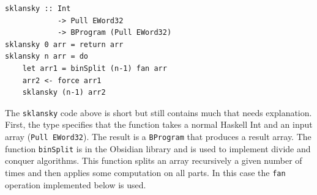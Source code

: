 \begin{small}
\begin{Verbatim}[samepage=true]
sklansky :: Int 
            -> Pull EWord32 
            -> BProgram (Pull EWord32)
sklansky 0 arr = return arr
sklansky n arr = do 
    let arr1 = binSplit (n-1) fan arr
    arr2 <- force arr1
    sklansky (n-1) arr2
\end{Verbatim}
\end{small} 


The {\tt sklansky} code above is short but still contains much that needs 
explanation. First, the type specifies that the function takes a normal 
Haskell Int and an input array ({\tt Pull EWord32}). The result is a {\tt BProgram} that 
produces a result array. 
The function {\tt binSplit} is in the Obsidian library and is used 
to implement divide and conquer algorithms. This function splits an array 
recursively a given number of times and then applies some computation on all 
parts. In this case the {\tt fan} operation implemented below is used. 


